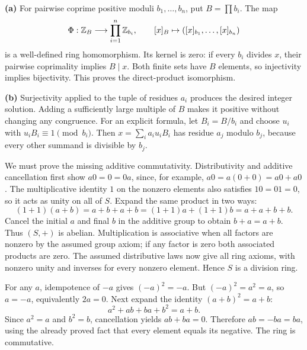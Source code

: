 \textbf{(a)} For pairwise coprime positive moduli $b_1,\ldots,b_n$, put $B=\prod b_i$. The map
\[\Phi:\mathbb{Z}_B\longrightarrow\prod_{i=1}^n\mathbb{Z}_{b_i},\qquad [x]_B\mapsto([x]_{b_1},\ldots,[x]_{b_n})
\]
is a well-defined ring homomorphism. Its kernel is zero: if every $b_i$ divides $x$, their pairwise coprimality implies $B\mid x$. Both finite sets have $B$ elements, so injectivity implies bijectivity. This proves the direct-product isomorphism.\par
\textbf{(b)} Surjectivity applied to the tuple of residues $a_i$ produces the desired integer solution. Adding a sufficiently large multiple of $B$ makes it positive without changing any congruence. For an explicit formula, let $B_i=B/b_i$ and choose $u_i$ with $u_iB_i\equiv1\pmod {b_i}$. Then $x=\sum_i a_i u_i B_i$ has residue $a_j$ modulo $b_j$, because every other summand is divisible by $b_j$.

We must prove the missing additive commutativity. Distributivity and additive cancellation first show $a0=0=0a$, since, for example, $a0=a(0+0)=a0+a0$. The multiplicative identity $1$ on the nonzero elements also satisfies $10=01=0$, so it acts as unity on all of $S$. Expand the same product in two ways:
\[(1+1)(a+b)=a+b+a+b=(1+1)a+(1+1)b=a+a+b+b.
\]
Cancel the initial $a$ and final $b$ in the additive group to obtain $b+a=a+b$. Thus $(S,+)$ is abelian. Multiplication is associative when all factors are nonzero by the assumed group axiom; if any factor is zero both associated products are zero. The assumed distributive laws now give all ring axioms, with nonzero unity and inverses for every nonzero element. Hence $S$ is a division ring.

For any $a$, idempotence of $-a$ gives $(-a)^2=-a$. But $(-a)^2=a^2=a$, so $a=-a$, equivalently $2a=0$. Next expand the identity $(a+b)^2=a+b$:
\[a^2+ab+ba+b^2=a+b.
\]
Since $a^2=a$ and $b^2=b$, cancellation yields $ab+ba=0$. Therefore $ab=-ba=ba$, using the already proved fact that every element equals its negative. The ring is commutative.

